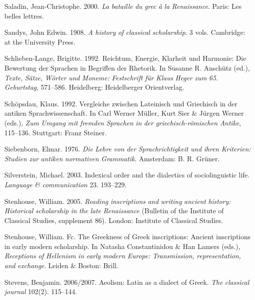 \documentclass[output=paper]{langsci/langscibook}
\begin{document}
Saladin, Jean-Christophe. 2000. \textit{La} \textit{bataille} \textit{du} \textit{grec} \textit{à} \textit{la} \textit{Renaissance}. Paris: Les belles lettres.

Sandys, John Edwin. 1908. \textit{A} \textit{history} \textit{of} \textit{classical} \textit{scholarship}. 3 vols. Cambridge: at the University Press.

Schlieben-Lange, Brigitte. 1992. Reichtum, Energie, Klarheit und Harmonie: Die Bewertung der Sprachen in Begriffen der Rhetorik. In Susanne R. Anschütz (ed.), \textit{Texte,} \textit{Sätze,} \textit{Wörter} \textit{und} \textit{Moneme:} \textit{Festschrift} \textit{für} \textit{Klaus} \textit{Heger} \textit{zum} \textit{65.} \textit{Geburtstag}, 571–586. Heidelberg: Heidelberger Orientverlag.

Schöpsdau, Klaus. 1992. Vergleiche zwischen Lateinisch und Griechisch in der antiken Sprachwissenschaft. In Carl Werner Müller, Kurt Sier \& Jürgen Werner (eds.), \textit{Zum} \textit{Umgang} \textit{mit} \textit{fremden} \textit{Sprachen} \textit{in} \textit{der} \textit{griechisch-römischen} \textit{Antike}, 115–136. Stuttgart: Franz Steiner.

Siebenborn, Elmar. 1976. \textit{Die} \textit{Lehre} \textit{von} \textit{der} \textit{Sprachrichtigkeit} \textit{und} \textit{ihren} \textit{Kriterien:} \textit{Studien} \textit{zur} \textit{antiken} \textit{normativen} \textit{Grammatik}. Amsterdam: B. R. Grüner.

Silverstein, Michael. 2003. Indexical order and the dialectics of sociolinguistic life. \textit{Language} \textit{\&} \textit{communication} 23. 193–229.

Stenhouse, William. 2005. \textit{Reading} \textit{inscriptions} \textit{and} \textit{writing} \textit{ancient} \textit{history:} \textit{Historical} \textit{scholarship} \textit{in} \textit{the} \textit{late} \textit{Renaissance} (Bulletin of the Institute of Classical Studies, supplement 86). London: Institute of Classical Studies.

Stenhouse, William. Fc. The Greekness of Greek inscriptions: Ancient inscriptions in early modern scholarship. In Natasha Constantinidou \& Han Lamers (eds.), \textit{Receptions} \textit{of} \textit{Hellenism} \textit{in} \textit{early} \textit{modern} \textit{Europe:} \textit{Transmission,} \textit{representation,} \textit{and} \textit{exchange}. Leiden \& Boston: Brill.

Stevens, Benjamin. 2006/2007. Aeolism: Latin as a dialect of Greek. \textit{The} \textit{classical} \textit{journal} 102(2). 115–144.
\end{document}
